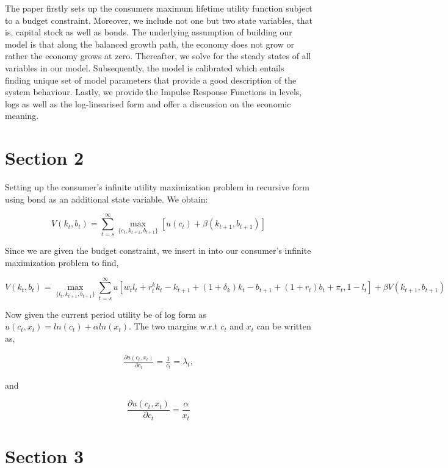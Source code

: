\documentclass[
  11pt,
  justified]{article}
\begin{document}
The paper firstly sets up the consumers maximum lifetime utility
function subject to a budget constraint. Moreover, we include not one
but two state variables, that is, capital stock as well as bonds. The
underlying assumption of building our model is that along the balanced
growth path, the economy does not grow or rather the economy grows at
zero. Thereafter, we solve for the steady states of all variables in our
model. Subsequently, the model is calibrated which entails finding
unique set of model parameters that provide a good description of the
system behaviour. Lastly, we provide the Impulse Response Functions in
levels, logs as well as the log-linearised form and offer a discussion
on the economic meaning.

\newpage

\hypertarget{section-2}{%
\section{Section 2}\label{section-2}}

Setting up the consumer's infinite utility maximization problem in
recursive form using bond as an additional state variable. We obtain:

\[
V(k_{t}, b_{t}) = \sum_{t=s}^{\infty} \max_{\{c_t, k_{t+1}, b_{t+1}\}} [u(c_t) + \beta(k_{t+1}, b_{t+1})]
\]

Since we are given the budget constraint, we insert in into our
consumer's infinite maximization problem to find,

\[
V(k_t, b_t) =  \max_{\{l_t, k_{t+1}, b_{t+1}\}} \sum_{t=s}^{\infty} u [w_tl_t + r_t^k k_t - k_{t+1} + (1+\delta_k)k_t - b_{t+1}  + (1+r_t)b_t + \pi_t, 1-l_t] +  \beta V(k_{t+1}, b_{t+1})
\]

Now given the current period utility be of log form as
\(u(c_t, x_t) = ln(c_t) + \alpha ln(x_t)\). The two margins w.r.t
\(c_t\) and \(x_t\) can be written as,

\begin{align}
\frac{\partial u(c_t, x_t)}{\partial c_t} = \frac{1}{c_t} = \lambda_t, \tag{marginal utility of consumption} \label{eq:mu_cons}
\end{align}

and

\[
\frac{\partial u(c_t, x_t)}{\partial c_t} = \frac{\alpha}{x_t}
\]

\hypertarget{section-3}{%
\section{Section 3}\label{section-3}}
\end{document}
